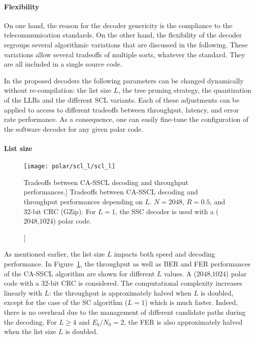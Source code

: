 \paragraph{Flexibility}

On one hand, the reason for the decoder genericity is the compliance to the
telecommunication standards. On the other hand, the flexibility of the decoder
regroups several algorithmic variations that are discussed in the following.
These variations allow several tradeoffs of multiple sorts, whatever the
standard. They are all included in a single source code.

In the proposed decoders the following parameters can be changed dynamically
without re-compilation: the list size $L$, the tree pruning strategy, the
quantization of the LLRs and the different SCL variants. Each of these
adjustments can be applied to access to different tradeoffs between throughput,
latency, and error rate performance. As a consequence, one can easily fine-tune
the configuration of the software decoder for any given polar code.

\paragraph{List size}

\begin{figure}[htp]
  \centering
  \texttt{[image: polar/scl\_l/scl\_l]}
  \caption
    [Tradeoffs between CA-SSCL decoding and throughput performances.]
    {Tradeoffs between CA-SSCL decoding and throughput performances depending on
    $L$. $N=2048$, $R=0.5$, and 32-bit CRC (GZip). For $L=1$, the SSC decoder is
    used with a ($2048$,$1024$) polar code.}
  \label{plot:polar_scl_l}
\end{figure}

As mentioned earlier, the list size $L$ impacts both speed and decoding
performance. In Figure~\ref{plot:polar_scl_l}, the throughput as well as BER and
FER performances of the CA-SSCL algorithm are shown for different $L$ values. A
($2048$,$1024$) polar code with a 32-bit CRC is considered. The computational
complexity increases linearly with $L$: the throughput is approximately halved
when $L$ is doubled, except for the case of the SC algorithm ($L=1$) which is
much faster. Indeed, there is no overhead due to the management of different
candidate paths during the decoding. For $L\geq4$ and $E_b/N_0=2$, the FER is
also approximately halved when the list size $L$ is doubled.

